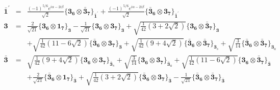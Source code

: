 \documentclass[english]{article}
\newcommand{\subcg}[3]{\big\{ {#1}\otimes{#2}\big\}^{}_{#3}}
\newcommand{\rep}[1]{\mathbf{#1}}
\begin{document}
\begin{itemize}
\begin{eqnarray*}
\\
\rep{\bar{1}^{\prime}} &=& \frac{(-1)^{5/6} e^{i \alpha -2 i \beta }}{\sqrt{2}}\subcg{\rep{3}_{\rep{6}}}{\rep{\bar{3}}_{\rep{7}}}{\rep{\bar{1}^{\prime}}}+\frac{(-1)^{5/6} e^{i \alpha -2 i \beta }}{\sqrt{2}}\subcg{\rep{\bar{3}}_{\rep{6}}}{\rep{3}_{\rep{7}}}{\rep{\bar{1}^{\prime}}}
\\
\rep{3} &=& \frac{2}{\sqrt{21}}\subcg{\rep{3}_{\rep{6}}}{\rep{1}_{\rep{7}}}{\rep{3}}-\frac{1}{\sqrt{21}}\subcg{\rep{3}_{\rep{6}}}{\rep{3}_{\rep{7}}}{\rep{3}}+\sqrt{\frac{1}{42} \left(3+2 \sqrt{2}\right)}\subcg{\rep{3}_{\rep{6}}}{\rep{\bar{3}}_{\rep{7}}}{\rep{3}} \\ 
 & & +\sqrt{\frac{1}{42} \left(11-6 \sqrt{2}\right)}\subcg{\rep{\bar{3}}_{\rep{6}}}{\rep{3}_{\rep{7}}}{\rep{3}}+\sqrt{\frac{1}{42} \left(9+4 \sqrt{2}\right)}\subcg{\rep{\bar{3}}_{\rep{6}}}{\rep{\bar{3}}_{\rep{7}}}{\rep{3}_{s}}+\sqrt{\frac{3}{14}}\subcg{\rep{\bar{3}}_{\rep{6}}}{\rep{\bar{3}}_{\rep{7}}}{\rep{3}_{a}}
\\
\rep{\bar{3}} &=& \sqrt{\frac{1}{42} \left(9+4 \sqrt{2}\right)}\subcg{\rep{3}_{\rep{6}}}{\rep{3}_{\rep{7}}}{\rep{\bar{3}}_{s}}+\sqrt{\frac{3}{14}}\subcg{\rep{3}_{\rep{6}}}{\rep{3}_{\rep{7}}}{\rep{\bar{3}}_{a}}+\sqrt{\frac{1}{42} \left(11-6 \sqrt{2}\right)}\subcg{\rep{3}_{\rep{6}}}{\rep{\bar{3}}_{\rep{7}}}{\rep{\bar{3}}} \\ 
 & & +\frac{2}{\sqrt{21}}\subcg{\rep{\bar{3}}_{\rep{6}}}{\rep{1}_{\rep{7}}}{\rep{\bar{3}}}+\sqrt{\frac{1}{42} \left(3+2 \sqrt{2}\right)}\subcg{\rep{\bar{3}}_{\rep{6}}}{\rep{3}_{\rep{7}}}{\rep{\bar{3}}}-\frac{1}{\sqrt{21}}\subcg{\rep{\bar{3}}_{\rep{6}}}{\rep{\bar{3}}_{\rep{7}}}{\rep{\bar{3}}}
\end{eqnarray*}
\end{itemize}
\end{document}
